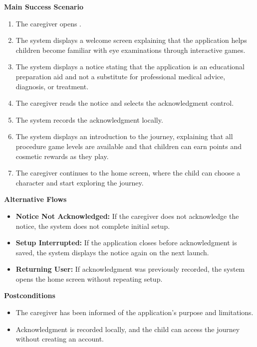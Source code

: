 \documentclass[12pt]{article}
\newcounter{ucnum} %
\begin{document}
\textbf{Main Success Scenario}
\begin{enumerate}
    \item The caregiver opens \progname{}.
    \item The system displays a welcome screen explaining that the
    application helps children become familiar with eye examinations
    through interactive games.
    \item The system displays a notice stating that the application is
    an educational preparation aid and not a substitute for professional
    medical advice, diagnosis, or treatment.
    \item The caregiver reads the notice and selects the acknowledgment
    control.
    \item The system records the acknowledgment locally.
    \item The system displays an introduction to the journey, explaining
    that all procedure game levels are available and that children can
    earn points and cosmetic rewards as they play.
    \item The caregiver continues to the home screen, where the child
    can choose a character and start exploring the journey.
\end{enumerate}

\textbf{Alternative Flows}
\begin{itemize}
    \item \textbf{Notice Not Acknowledged:} If the caregiver does not
    acknowledge the notice, the system does not complete initial setup.
    \item \textbf{Setup Interrupted:} If the application closes before
    acknowledgment is saved, the system displays the notice again on
    the next launch.
    \item \textbf{Returning User:} If acknowledgment was previously
    recorded, the system opens the home screen without repeating setup.
\end{itemize}

\textbf{Postconditions}
\begin{itemize}
    \item The caregiver has been informed of the application's purpose
    and limitations.
    \item Acknowledgment is recorded locally, and the child can access
    the journey without creating an account.
\end{itemize}

\label{UC_ChooseCharacter}
\end{document}
